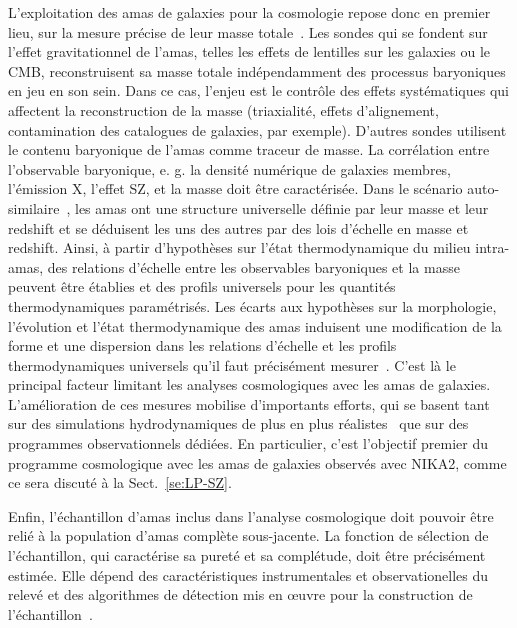 L'exploitation des amas de galaxies pour la cosmologie repose donc en
premier lieu, sur la mesure précise de leur masse
totale~\citep[voir \emph{e.g.}][pour une revue récente sur la mesure
de la masse des amas]{Pratt2019}. Les sondes qui se fondent sur l'effet
gravitationnel de l'amas, telles les effets
de lentilles sur les galaxies ou le CMB, reconstruisent sa masse
totale indépendamment des processus baryoniques en jeu en son
sein. Dans ce cas, l'enjeu est le contrôle des effets systématiques qui
affectent la reconstruction de la masse (triaxialité, effets
d'alignement, contamination des catalogues de galaxies, par
exemple). D'autres sondes utilisent le
contenu baryonique de l'amas comme traceur de masse. La corrélation
entre l'observable baryonique, e. g. la densité numérique de galaxies
membres, l'émission X, l'effet SZ, et la masse doit être
caractérisée. Dans le scénario auto-similaire~\citep{Kaiser1986}, les
amas ont une structure universelle définie par leur masse et leur
redshift et se déduisent les uns des autres par des lois d'échelle en
masse et redshift. Ainsi, à partir d'hypothèses sur l'état
thermodynamique du milieu intra-amas, des relations d'échelle entre
les observables baryoniques et la masse peuvent être établies et des
profils universels pour les quantités thermodynamiques
paramétrisés. Les écarts aux hypothèses sur la morphologie,
l'évolution et l'état thermodynamique des amas induisent une
modification de la forme et une dispersion dans les relations
d'échelle et les profils thermodynamiques universels qu'il faut
précisément mesurer~\citep{NFW1996, Nagai2007, Arnaud2010}. C'est là le
principal facteur limitant les analyses cosmologiques avec les amas de
galaxies. L'amélioration de ces mesures mobilise d'importants efforts,
qui se basent tant sur des simulations hydrodynamiques de plus en plus
réalistes~\citep[comme exemple récent]{Henden2019} que sur des programmes
observationnels dédiées. 
En particulier, c'est l'objectif premier du programme cosmologique
avec les amas de galaxies observés avec NIKA2, comme ce sera discuté à
la Sect.~\ref{se:LP-SZ}.

Enfin, l'échantillon d'amas inclus dans l'analyse cosmologique doit
pouvoir être relié à la population d'amas complète sous-jacente. La
fonction de sélection de l'échantillon, qui caractérise sa pureté et
sa complétude, doit être précisément estimée. Elle dépend des
caractéristiques instrumentales et observationelles du relevé et des
algorithmes de détection mis en œuvre pour la construction de
l'échantillon~\citep[par exemple]{Melin2005}. \\

